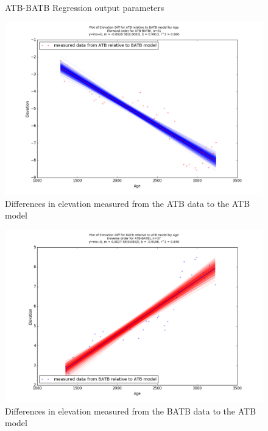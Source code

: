 \begin{figure}[h]
	\begin{flushleft}
	\end{flushleft}
	\caption{ATB-BATB Regression output parameters}
	\label{fig:ATBxBATB_regression}
\end{figure}

\newpage

\begin{figure}[h]
	\includegraphics[width=0.9\linewidth]{data/bothNonZero/withinSeventyFivePercent/gias/theGIA_ATB_relative_to_BATB.png}
	\caption{Differences in elevation measured from the ATB data to the ATB model}
	\label{fig:gias_ATBxBATB}
\end{figure}
\newpage


\begin{figure}[h]
	\includegraphics[width=0.9\linewidth]{data/bothNonZero/withinSeventyFivePercent/gias/theGIA_BATB_relative_to_ATB.png}
	\caption{Differences in elevation measured from the BATB data to the ATB model}
	\label{fig:gias_BATBxATB}
\end{figure}
\newpage














